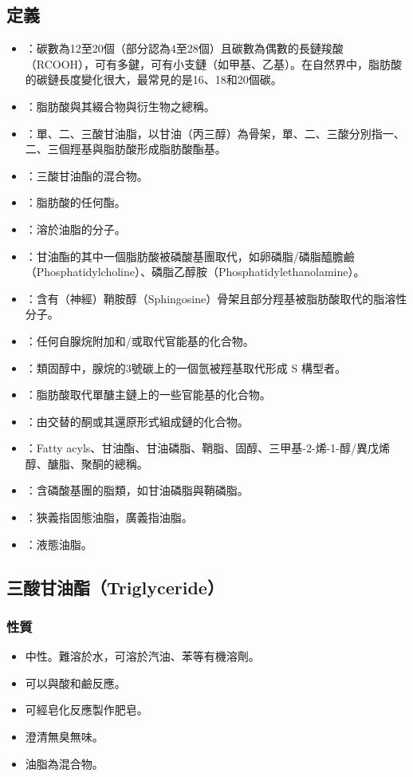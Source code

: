 \documentclass[a4paper,12pt]{report}
\begin{document}
\begin{itemize}
\begin{itemize}
\subsection{定義}
\begin{itemize}
\item{}：碳數為12至20個（部分認為4至28個）且碳數為偶數的長鏈羧酸（RCOOH），可有多鍵，可有小支鏈（如甲基、乙基）。在自然界中，脂肪酸的碳鏈長度變化很大，最常見的是16、18和20個碳。
\item{}：脂肪酸與其綴合物與衍生物之總稱。
\item{}：單、二、三酸甘油脂，以甘油（丙三醇）為骨架，單、二、三酸分別指一、二、三個羥基與脂肪酸形成脂肪酸酯基。
\item{}：三酸甘油酯的混合物。
\item{}：脂肪酸的任何酯。
\item{}：溶於油脂的分子。
\item{}：甘油酯的其中一個脂肪酸被磷酸基團取代，如卵磷脂/磷脂醯膽鹼（Phosphatidylcholine）、磷脂乙醇胺（Phosphatidylethanolamine）。
\item{}：含有（神經）鞘胺醇（Sphingosine）骨架且部分羥基被脂肪酸取代的脂溶性分子。
\item{}：任何自腺烷附加和/或取代官能基的化合物。
\item{}：類固醇中，腺烷的3號碳上的一個氫被羥基取代形成 S 構型者。
\item{}：脂肪酸取代單醣主鏈上的一些官能基的化合物。
\item{}：由交替的酮或其還原形式組成鏈的化合物。
\item{}：Fatty acyls、甘油酯、甘油磷脂、鞘脂、固醇、三甲基-2-烯-1-醇/異戊烯醇、醣脂、聚酮的總稱。
\item{}：含磷酸基團的脂類，如甘油磷脂與鞘磷脂。
\item{}：狹義指固態油脂，廣義指油脂。
\item{}：液態油脂。
\end{itemize}
\subsection{三酸甘油酯（Triglyceride）}
\subsubsection{性質}
\begin{itemize}
\item 中性。難溶於水，可溶於汽油、苯等有機溶劑。
\item 可以與酸和鹼反應。
\item 可經皂化反應製作肥皂。
\item 澄清無臭無味。
\item 油脂為混合物。
\end{itemize}

\end{itemize}
\end{itemize}
\end{document}
